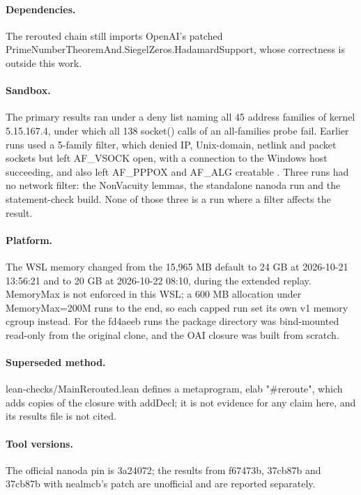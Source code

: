 \paragraph{Dependencies.}
The rerouted chain still imports OpenAI's patched PrimeNumberTheoremAnd.SiegelZeros.HadamardSupport, whose correctness is outside this work.

\paragraph{Sandbox.}
The primary results ran under a deny list naming all 45 address families of kernel 5.15.167.4, under which all 138 socket() calls of an all-families probe fail.
Earlier runs used a 5-family filter, which denied IP, Unix-domain, netlink and packet sockets but left AF\_VSOCK open, with a connection to the Windows host succeeding, and also left AF\_PPPOX and AF\_ALG creatable \cite{grwtsk-40}.
Three runs had no network filter: the NonVacuity lemmas, the standalone nanoda run and the statement-check build.
None of those three is a run where a filter affects the result.

\paragraph{Platform.}
The WSL memory changed from the 15,965 MB default to 24 GB at 2026-10-21 13:56:21 and to 20 GB at 2026-10-22 08:10, during the extended replay.
MemoryMax is not enforced in this WSL; a 600 MB allocation under MemoryMax=200M runs to the end, so each capped run set its own v1 memory cgroup instead.
For the fd4aeeb runs the package directory was bind-mounted read-only from the original clone, and the OAI closure was built from scratch.

\paragraph{Superseded method.}
lean-checks/MainRerouted.lean defines a metaprogram, elab "\#reroute", which adds copies of the closure with addDecl; it is not evidence for any claim here, and its results file is not cited.

\paragraph{Tool versions.}
The official nanoda pin is 3a24072; the results from f67473b, 37cb87b and 37cb87b with nealmcb's patch are unofficial and are reported separately.
